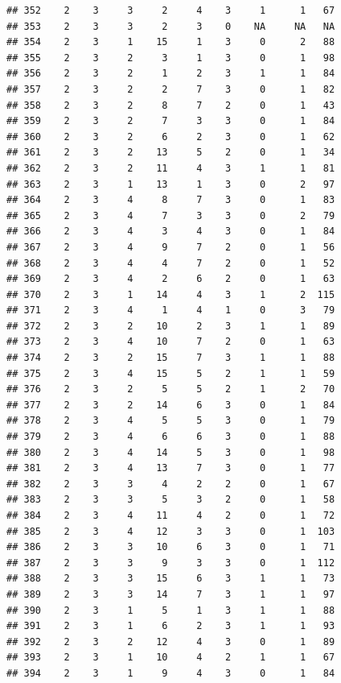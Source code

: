 \documentclass[krantz2]{krantz}\usepackage{knitr}%
\begin{document}
\begin{knitrout}
\begin{kframe}
\begin{verbatim}
## 352    2    3     3     2     4    3     1      1   67
## 353    2    3     3     2     3    0    NA     NA   NA
## 354    2    3     1    15     1    3     0      2   88
## 355    2    3     2     3     1    3     0      1   98
## 356    2    3     2     1     2    3     1      1   84
## 357    2    3     2     2     7    3     0      1   82
## 358    2    3     2     8     7    2     0      1   43
## 359    2    3     2     7     3    3     0      1   84
## 360    2    3     2     6     2    3     0      1   62
## 361    2    3     2    13     5    2     0      1   34
## 362    2    3     2    11     4    3     1      1   81
## 363    2    3     1    13     1    3     0      2   97
## 364    2    3     4     8     7    3     0      1   83
## 365    2    3     4     7     3    3     0      2   79
## 366    2    3     4     3     4    3     0      1   84
## 367    2    3     4     9     7    2     0      1   56
## 368    2    3     4     4     7    2     0      1   52
## 369    2    3     4     2     6    2     0      1   63
## 370    2    3     1    14     4    3     1      2  115
## 371    2    3     4     1     4    1     0      3   79
## 372    2    3     2    10     2    3     1      1   89
## 373    2    3     4    10     7    2     0      1   63
## 374    2    3     2    15     7    3     1      1   88
## 375    2    3     4    15     5    2     1      1   59
## 376    2    3     2     5     5    2     1      2   70
## 377    2    3     2    14     6    3     0      1   84
## 378    2    3     4     5     5    3     0      1   79
## 379    2    3     4     6     6    3     0      1   88
## 380    2    3     4    14     5    3     0      1   98
## 381    2    3     4    13     7    3     0      1   77
## 382    2    3     3     4     2    2     0      1   67
## 383    2    3     3     5     3    2     0      1   58
## 384    2    3     4    11     4    2     0      1   72
## 385    2    3     4    12     3    3     0      1  103
## 386    2    3     3    10     6    3     0      1   71
## 387    2    3     3     9     3    3     0      1  112
## 388    2    3     3    15     6    3     1      1   73
## 389    2    3     3    14     7    3     1      1   97
## 390    2    3     1     5     1    3     1      1   88
## 391    2    3     1     6     2    3     1      1   93
## 392    2    3     2    12     4    3     0      1   89
## 393    2    3     1    10     4    2     1      1   67
## 394    2    3     1     9     4    3     0      1   84
\end{verbatim}
\end{kframe}
\end{knitrout}
\end{document}
